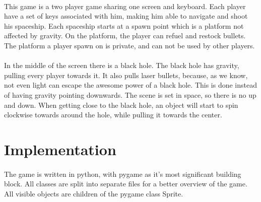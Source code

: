 \documentclass{article}
\begin{document}
\paragraph{}
This game is a two player game sharing one screen and keyboard. Each player have a set of keys associated with him, making him able to navigate and shoot his spaceship. Each spaceship starts at a spawn point which is a platform not affected by gravity. On the platform, the player can refuel and restock bullets. The platform a player spawn on is private, and can not be used by other players. 
\paragraph{}
In the middle of the screen there is a black hole. The black hole has gravity, pulling every player towards it. It also pulls laser bullets, because, as we know, not even light can escape the awesome power of a black hole. This is done instead of having gravity pointing downwards. The scene is set in space, so there is no up and down. When getting close to the black hole, an object will start to spin clockwise towards around the hole, while pulling it towards the center. 
\paragraph{}

\section{Implementation}
\paragraph{}
The game is written in python, with pygame as it's most significant building block. All classes are split into separate files for a better overview of the game. All visible objects are children of the pygame class Sprite.
\end{document}
